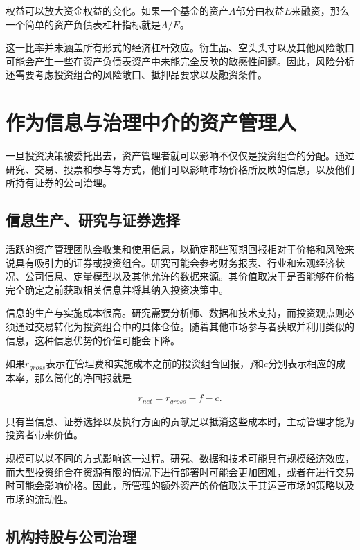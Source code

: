 权益可以放大资金权益的变化。如果一个基金的资产$A$部分由权益$E$来融资，那么一个简单的资产负债表杠杆指标就是$A/E$。

这一比率并未涵盖所有形式的经济杠杆效应。衍生品、空头头寸以及其他风险敞口可能会产生一些在资产负债表资产中未能完全反映的敏感性问题。因此，风险分析还需要考虑投资组合的风险敞口、抵押品要求以及融资条件。

\section[作为信息与治理中介的资产管理人]{作为信息与治理中介的资产管理人}

一旦投资决策被委托出去，资产管理者就可以影响不仅仅是投资组合的分配。通过研究、交易、投票和参与等方式，他们可以影响市场价格所反映的信息，以及他们所持有证券的公司治理。

\subsection{信息生产、研究与证券选择}

活跃的资产管理团队会收集和使用信息，以确定那些预期回报相对于价格和风险来说具有吸引力的证券或投资组合。研究可能会参考财务报表、行业和宏观经济状况、公司信息、定量模型以及其他允许的数据来源。其价值取决于是否能够在价格完全确定之前获取相关信息并将其纳入投资决策中。

信息的生产与实施成本很高。研究需要分析师、数据和技术支持，而投资观点则必须通过交易转化为投资组合中的具体仓位。随着其他市场参与者获取并利用类似的信息，这种信息优势的价值可能会下降。

如果$r_{gross}$表示在管理费和实施成本之前的投资组合回报，$f$和$c$分别表示相应的成本率，那么简化的净回报就是

\begin{equation}
r_{net}=r_{gross}-f-c.
\label{eq:ch14-net-portfolio-return}
\end{equation}

只有当信息、证券选择以及执行方面的贡献足以抵消这些成本时，主动管理才能为投资者带来价值。

规模可以以不同的方式影响这一过程。研究、数据和技术可能具有规模经济效应，而大型投资组合在资源有限的情况下进行部署时可能会更加困难，或者在进行交易时可能会影响价格。因此，所管理的额外资产的价值取决于其运营市场的策略以及市场的流动性。

\subsection{机构持股与公司治理}


